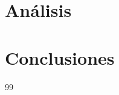 \documentclass[11pt,letterpaper,twocolumn]{article}
\numberwithin{equation}{section}
\numberwithin{figure}{section}
\begin{document}
\section{An\'alisis}
\section{Conclusiones}
\begin{thebibliography}{99}

\end{thebibliography}
\end{document}
